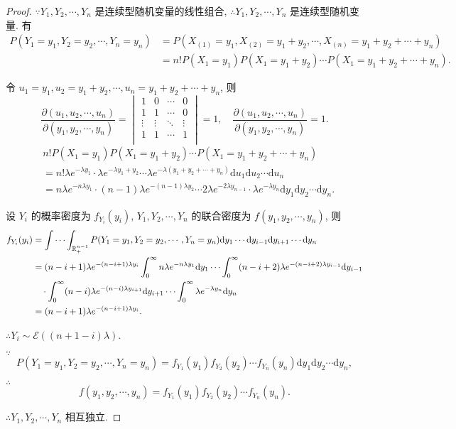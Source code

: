\documentclass{ctexart}
\begin{document}
\begin{proof}
    $\because Y_1,Y_2,\cdots,Y_n$ 是连续型随机变量的线性组合, $\therefore Y_1,Y_2,\cdots,Y_n$ 是连续型随机变量. 有
    \begin{align*}
        P(Y_1=y_1,Y_2=y_2,\cdots,Y_n=y_n) & =P(X_{(1)}=y_1,X_{(2)}=y_1+y_2,\cdots,X_{(n)}=y_1+y_2+\cdots+y_n) \\
        & =n!P(X_1=y_1)P(X_1=y_1+y_2)\cdots P(X_1=y_1+y_2+\cdots+y_n).
    \end{align*}

    令 $u_1=y_1,u_2=y_1+y_2,\cdots,u_n=y_1+y_2+\cdots+y_n$, 则
    \[\dfrac{\partial(u_1,u_2,\cdots,u_n)}{\partial(y_1,y_2,\cdots,y_n)}=\begin{vmatrix}
        1 & 0 & \cdots & 0 \\
        1 & 1 & \cdots & 0 \\
        \vdots & \vdots & \ddots & \vdots \\
        1 & 1 & \cdots & 1 \\
    \end{vmatrix}=1,\quad\dfrac{\partial(u_1,u_2,\cdots,u_n)}{\partial(y_1,y_2,\cdots,y_n)}=1.\]
    \begin{align*}
        & n!P(X_1=y_1)P(X_1=y_1+y_2)\cdots P(X_1=y_1+y_2+\cdots+y_n) \\
        & =n!\lambda e^{-\lambda y_1}\cdot\lambda e^{-\lambda y_1+y_2}\cdots\lambda e^{-\lambda(y_1+y_2+\cdots+y_n)}\mathrm{d}u_1\mathrm{d}u_2\cdots\mathrm{d}u_n \\
        & =n\lambda e^{-n\lambda y_1}\cdot(n-1)\lambda e^{-(n-1)\lambda y_2}\cdots2\lambda e^{-2\lambda y_{n-1}}\cdot\lambda e^{-\lambda y_n}\mathrm{d}y_1\mathrm{d}y_2\cdots\mathrm{d}y_n.
    \end{align*}

    设 $Y_i$ 的概率密度为 $f_{Y_i}(y_i)$, $Y_1,Y_2,\cdots,Y_n$ 的联合密度为 $f(y_1,y_2,\cdots,y_n)$, 则
    \begin{align*}
        f_{Y_i}(y_i) & =\idotsint_{\mathbb{R}_+^{n-1}}P(Y_1=y_1,Y_2=y_2,\cdots,Y_n=y_n)\mathrm{d}y_1\cdots\mathrm{d}y_{i-1}\mathrm{d}y_{i+1}\cdots\mathrm{d}y_n \\
        & =(n-i+1)\lambda e^{-(n-i+1)\lambda y_i}\int_0^\infty n\lambda e^{-n\lambda y_1}\mathrm{d}y_1\cdots\int_0^\infty(n-i+2)\lambda e^{-(n-i+2)\lambda y_{i-1}}\mathrm{d}y_{i-1} \\
        & \quad\cdot\int_0^\infty(n-i)\lambda e^{-(n-i)\lambda y_{i+1}}\mathrm{d}y_{i+1}\cdots\int_0^\infty\lambda e^{-\lambda y_n}\mathrm{d}y_n \\
        & =(n-i+1)\lambda e^{-(n-i+1)\lambda y_i}.
    \end{align*}

    $\therefore Y_i\sim\mathcal{E}((n+1-i)\lambda)$.

    $\because$
    \[P(Y_1=y_1,Y_2=y_2,\cdots,Y_n=y_n)=f_{Y_1}(y_1)f_{Y_2}(y_2)\cdots f_{Y_n}(y_n)\mathrm{d}y_1\mathrm{d}y_2\cdots\mathrm{d}y_n,\]

    $\therefore$
    \[f(y_1,y_2,\cdots,y_n)=f_{Y_1}(y_1)f_{Y_2}(y_2)\cdots f_{Y_n}(y_n).\]

    $\therefore Y_1,Y_2,\cdots,Y_n$ 相互独立.
\end{proof}
\end{document}
